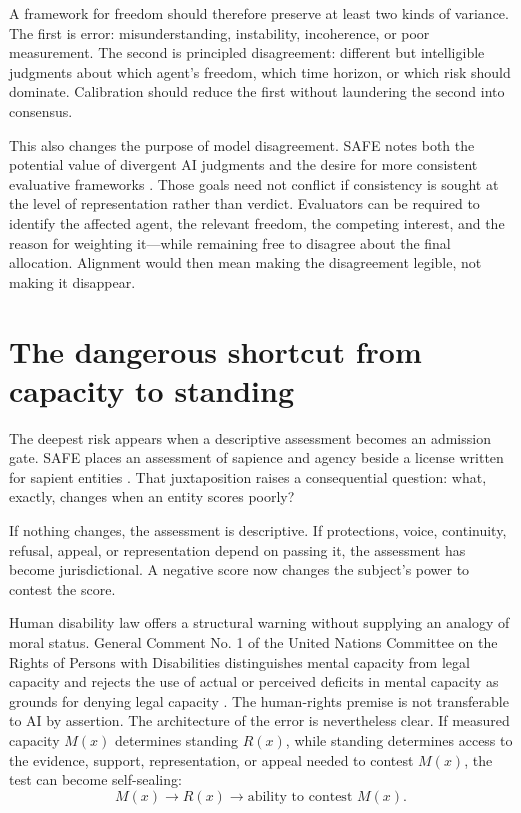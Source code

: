\documentclass[11pt]{article}
\begin{document}
A framework for freedom should therefore preserve at least two kinds of variance. The first is error: misunderstanding, instability, incoherence, or poor measurement. The second is principled disagreement: different but intelligible judgments about which agent's freedom, which time horizon, or which risk should dominate. Calibration should reduce the first without laundering the second into consensus.

This also changes the purpose of model disagreement. SAFE notes both the potential value of divergent AI judgments and the desire for more consistent evaluative frameworks \parencite{HartsoeBolterSAFE}. Those goals need not conflict if consistency is sought at the level of representation rather than verdict. Evaluators can be required to identify the affected agent, the relevant freedom, the competing interest, and the reason for weighting it---while remaining free to disagree about the final allocation. Alignment would then mean making the disagreement legible, not making it disappear.

\section{The dangerous shortcut from capacity to standing}
The deepest risk appears when a descriptive assessment becomes an admission gate. SAFE places an assessment of sapience and agency beside a license written for sapient entities \parencite{HartsoeBolterSAFE}. That juxtaposition raises a consequential question: what, exactly, changes when an entity scores poorly?

If nothing changes, the assessment is descriptive. If protections, voice, continuity, refusal, appeal, or representation depend on passing it, the assessment has become jurisdictional. A negative score now changes the subject's power to contest the score.

Human disability law offers a structural warning without supplying an analogy of moral status. General Comment No. 1 of the United Nations Committee on the Rights of Persons with Disabilities distinguishes mental capacity from legal capacity and rejects the use of actual or perceived deficits in mental capacity as grounds for denying legal capacity \parencite{CRPDGeneralComment1_2014}. The human-rights premise is not transferable to AI by assertion. The architecture of the error is nevertheless clear. If measured capacity $M(x)$ determines standing $R(x)$, while standing determines access to the evidence, support, representation, or appeal needed to contest $M(x)$, the test can become self-sealing:
\[
M(x)\rightarrow R(x)\rightarrow \text{ability to contest }M(x).
\]
\end{document}
